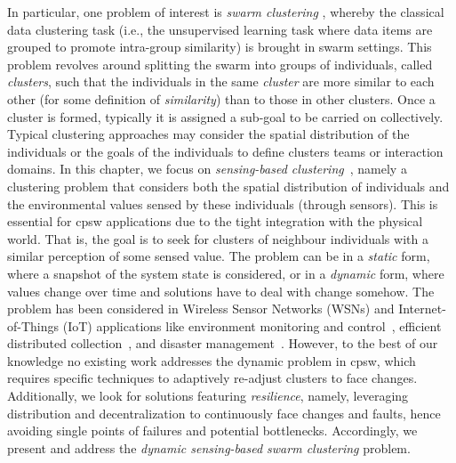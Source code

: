 In particular, one problem of interest is \emph{swarm clustering} \cite{DBLP:conf/smc/LeeKK05,DBLP:journals/asc/CruzNM17},
 whereby the classical data clustering task
 (i.e., the unsupervised learning task where data items are grouped to promote intra-group similarity)
 is brought in swarm settings.
%
This problem revolves around splitting the swarm
 into groups of individuals, called \emph{clusters},
 such that the individuals in the same \emph{cluster}
 are more similar to each other (for some definition of \emph{similarity}) than to those in other clusters.
%
Once a cluster is formed, typically it is assigned a sub-goal to be carried on collectively.
%
Typical clustering approaches may consider
 the spatial distribution of the individuals
 or the goals of the individuals to define clusters
  teams or interaction domains.
%
In this chapter, 
 we focus on \emph{sensing-based clustering}~\cite{DBLP:conf/ccnc/LinM07}, namely
 a clustering problem
 that considers both the spatial distribution of individuals
 and the environmental values sensed by these individuals (through sensors).
 This is essential for \ac{cpsw} applications due to the tight integration with the physical world.
%
That is, the goal is to seek for clusters of neighbour individuals with a similar perception of some sensed value.
%
The problem can be in a \emph{static} form,
 where a snapshot of the system state is considered,
 or in a \emph{dynamic} form,
 where values change over time
 and solutions have to deal with change somehow.
%
The problem has been considered in Wireless Sensor Networks (WSNs) and Internet-of-Things (IoT) applications like
  environment monitoring and control~\cite{DBLP:conf/ccnc/LinM07},
  efficient distributed collection~\cite{DBLP:journals/ijcomsys/PhamLPC10},
  and disaster management~\cite{DBLP:journals/jaihc/KucukBSK20}.
%
However, to the best of our knowledge no existing work addresses the dynamic problem in \ac{cpsw}, which requires specific
techniques to adaptively re-adjust clusters to face changes.
%
Additionally, we look for solutions featuring \emph{resilience}, namely,
 leveraging distribution and decentralization to continuously face changes and faults, hence avoiding single points of failures and potential bottlenecks.
%
Accordingly, we present and address the \emph{dynamic sensing-based swarm clustering} problem.
%

